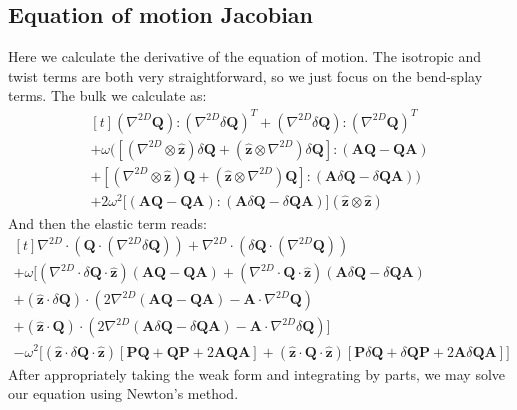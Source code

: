 \documentclass[reqno]{article}
\newcommand{\Q}{\mathbf{Q}}
\newcommand{\bP}{\mathbf{P}}
\newcommand{\A}{\mathbf{A}}
\newcommand{\z}{\mathbf{\hat{z}}}
\begin{document}
\subsection{Equation of motion Jacobian}

Here we calculate the derivative of the equation of motion.
The isotropic and twist terms are both very straightforward, so we just focus on the bend-splay terms.
The bulk we calculate as:
\begin{equation}
    \begin{multlined}[t]
        \left( \nabla^{2D} \Q \right) : \left( \nabla^{2D} \delta \Q \right)^T
        + \left( \nabla^{2D} \delta \Q \right): \left( \nabla^{2D} \Q \right)^T \\
        + \omega \biggl(
            \left[ \left( \nabla^{2D} \otimes \z \right) \delta \Q 
                + \left( \z \otimes \nabla^{2D} \right) \delta \Q
            \right] : \left( \A \Q - \Q \A \right) \\
            +
            \left[ \left( \nabla^{2D} \otimes \z \right) \Q 
                + \left( \z \otimes \nabla^{2D} \right) \Q
            \right] : \left( \A \delta \Q - \delta \Q \A \right) 
        \biggr) \\
        + 2 \omega^2 \bigl[ 
            \left( \A \Q - \Q \A \right) : \left( \A \delta \Q - \delta \Q \A \right) 
        \bigr] \left( \z \otimes \z \right)
    \end{multlined}
\end{equation}
And then the elastic term reads:
\begin{equation}
    \begin{multlined}[t]
        \nabla^{2D} \cdot \left( \Q \cdot \left( \nabla^{2D} \delta \Q \right) \right)
        + \nabla^{2D} \cdot \left( \delta \Q \cdot \left( \nabla^{2D} \Q \right) \right) \\
        + \omega \biggl[
            \left(\nabla^{2D} \cdot \delta \Q \cdot \z \right)
            \left(\A \Q - \Q \A \right)
            + \left(\nabla^{2D} \cdot \Q \cdot \z \right)
            \left(\A \delta \Q - \delta \Q \A \right) \\
            +
            \left( \z \cdot \delta \Q \right) \cdot \left( 
                2 \nabla^{2D} \left( \A \Q - \Q \A \right)
                - \A \cdot \nabla^{2D} \Q
            \right) \\
            +
            \left( \z \cdot \Q \right) \cdot \left( 
                2 \nabla^{2D} \left( \A \delta \Q - \delta \Q \A \right)
                - \A \cdot \nabla^{2D} \delta \Q
            \right)
        \biggr] \\
        -\omega^2 \bigl[
            \left( \z \cdot \delta \Q \cdot \z \right) \left[
                \bP \Q + \Q \bP + 2 \A \Q \A
            \right]
            +
            \left( \z \cdot \Q \cdot \z \right) \left[
                \bP \delta \Q + \delta \Q \bP + 2\A \delta \Q \A
            \right]
        \bigr]
    \end{multlined}
\end{equation}
After appropriately taking the weak form and integrating by parts, we may solve our equation using Newton's method.
\end{document}
